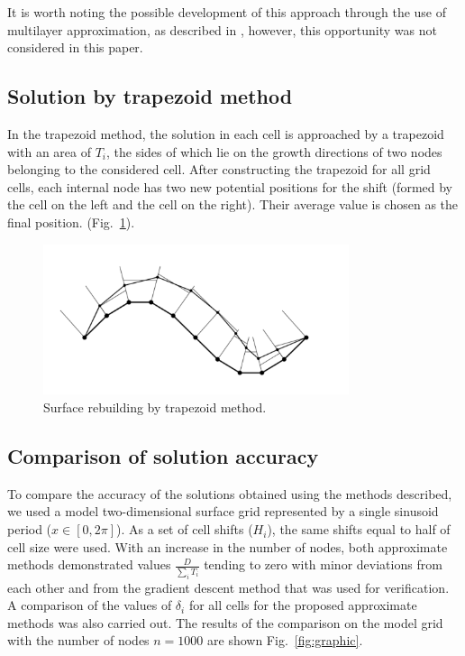 \documentclass[
11pt,%
tightenlines,%
twoside,%
onecolumn,%
nofloats,%
nobibnotes,%
nofootinbib,%
superscriptaddress,%
noshowpacs,%
centertags]%
{revtex4}
\begin{document}
It is worth noting the possible development of this approach through the use of multilayer approximation, as described in \cite{Bourgault_Cote}, however, this opportunity was not considered in this paper.

\subsection{Solution by trapezoid method}

In the trapezoid method, the solution in each cell is approached by a trapezoid with an area of $T_i$, the sides of which lie on the growth directions of two nodes belonging to the considered cell.
After constructing the trapezoid for all grid cells, each internal node has two new potential positions for the shift (formed by the cell on the left and the cell on the right).
Their average value is chosen as the final position. (Fig.~\ref{fig:grid_trapeziums}).

\begin{figure}[h]
\setcaptionmargin{5mm}
\onelinecaptionstrue
\includegraphics[width=0.8\textwidth]{pics/grid_trapeziums.pdf}
\caption{Surface rebuilding by trapezoid method.}
\label{fig:grid_trapeziums}
\end{figure}

\subsection{Comparison of solution accuracy}

To compare the accuracy of the solutions obtained using the methods described, we used a model two-dimensional surface grid represented by a single sinusoid period ($x \in [0, 2 \pi]$).
As a set of cell shifts ($ H_i $), the same shifts equal to half of cell size were used.
With an increase in the number of nodes, both approximate methods demonstrated values $\frac{D}{\sum_i{T_i}}$ tending to zero with minor deviations from each other and from the gradient descent method that was used for verification.
A comparison of the values of $\delta_i$ for all cells for the proposed approximate methods was also carried out.
The results of the comparison on the model grid with the number of nodes $n = 1000$ are shown Fig.~\ref{fig:graphic}.
\end{document}
